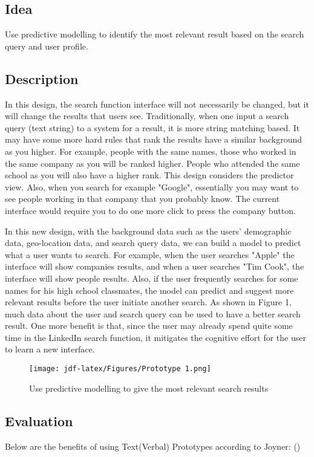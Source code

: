 \documentclass[
	letterpaper, %
]{jdf}
\begin{document}
\subsection{Idea}
Use predictive modelling to identify the most relevant result based on the search query and user profile.
\subsection{Description}
In this design, the search function interface will not necessarily be changed, but it will change the results that users see. Traditionally, when one input a search query (text string) to a system for a result, it is more string matching based. It may have some more hard rules that rank the results have a similar background as you higher. For example, people with the same names, those who worked in the same company as you will be ranked higher. People who attended the same school as you will also have a higher rank. This design considers the predictor view. Also, when you search for example "Google", essentially you may want to see people working in that company that you probably know. The current interface would require you to do one more click to press the company button.

In this new design, with the background data such as the users' demographic data, geo-location data, and search query data, we can build a model to predict what a user wants to search. For example, when the user searches "Apple" the interface will show companies results, and when a user searches "Tim Cook", the interface will show people results. Also, if the user frequently searches for some names for his high school classmates, the model can predict and suggest more relevant results before the user initiate another search. As shown in Figure 1, much data about the user and search query can be used to have a better search result. One more benefit is that, since the user may already spend quite some time in the LinkedIn search function, it mitigates the cognitive effort for the user to learn a new interface.


\begin{figure}[h]
	\centering
	\texttt{[image: jdf-latex/Figures/Prototype 1.png]}
	\caption{Use predictive modelling to give the most relevant search results}
	\label{fig:predictive}
\end{figure}

\subsection{Evaluation}
Below are the benefits of using Text(Verbal) Prototypes according to Joyner: (\cite{joyner2016b})
\end{document}
